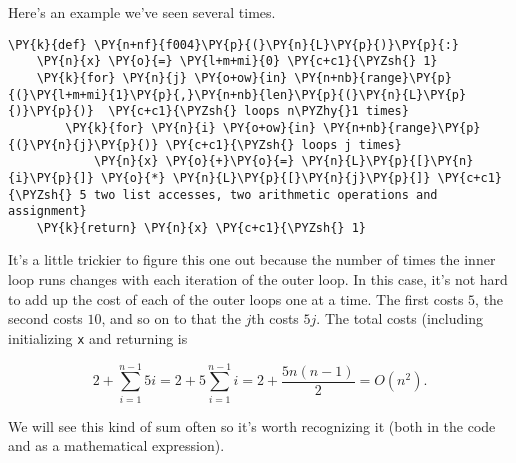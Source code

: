 Here's an example we've seen several times.

\begin{Verbatim}[commandchars=\\\{\}]
\PY{k}{def} \PY{n+nf}{f004}\PY{p}{(}\PY{n}{L}\PY{p}{)}\PY{p}{:}
    \PY{n}{x} \PY{o}{=} \PY{l+m+mi}{0} \PY{c+c1}{\PYZsh{} 1}
    \PY{k}{for} \PY{n}{j} \PY{o+ow}{in} \PY{n+nb}{range}\PY{p}{(}\PY{l+m+mi}{1}\PY{p}{,}\PY{n+nb}{len}\PY{p}{(}\PY{n}{L}\PY{p}{)}\PY{p}{)}  \PY{c+c1}{\PYZsh{} loops n\PYZhy{}1 times}
        \PY{k}{for} \PY{n}{i} \PY{o+ow}{in} \PY{n+nb}{range}\PY{p}{(}\PY{n}{j}\PY{p}{)} \PY{c+c1}{\PYZsh{} loops j times}
            \PY{n}{x} \PY{o}{+}\PY{o}{=} \PY{n}{L}\PY{p}{[}\PY{n}{i}\PY{p}{]} \PY{o}{*} \PY{n}{L}\PY{p}{[}\PY{n}{j}\PY{p}{]} \PY{c+c1}{\PYZsh{} 5 two list accesses, two arithmetic operations and assignment}
    \PY{k}{return} \PY{n}{x} \PY{c+c1}{\PYZsh{} 1}
\end{Verbatim}



It's a little trickier to figure this one out because the number of times the inner loop runs changes with each iteration of the outer loop.
In this case, it's not hard to add up the cost of each of the outer loops one at a time.
The first costs $5$, the second costs $10$, and so on to that the $j$th costs $5j$.
The total costs (including initializing \texttt{x} and returning is


\[
2 + \sum_{i=1}^{n-1}5i = 2 + 5\sum_{i=1}^{n-1}i = 2 + \frac{5n(n-1)}{2} = O(n^2).
\]


We will see this kind of sum often so it's worth recognizing it (both in the code and as a mathematical expression).
